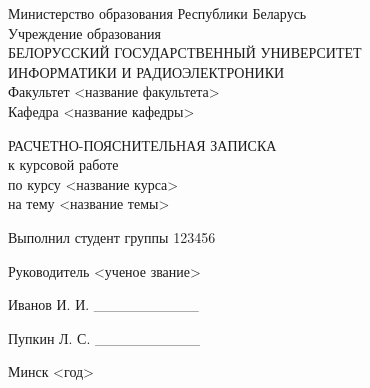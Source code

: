 \begin{titlepage}
\thispagestyle{empty}
\setlength{\parindent}{0ex} %

\begin{center}
  Министерство образования Республики Беларусь \\
  \smallskip
  Учреждение образования \\
  БЕЛОРУССКИЙ ГОСУДАРСТВЕННЫЙ УНИВЕРСИТЕТ \\
  ИНФОРМАТИКИ И РАДИОЭЛЕКТРОНИКИ \\
  \smallskip
  Факультет <название факультета> \\
  \smallskip
  Кафедра <название кафедры>
\end{center}

\vspace{60mm}

\begin{center}
  РАСЧЕТНО-ПОЯСНИТЕЛЬНАЯ ЗАПИСКА \\
  к курсовой работе \\
  по курсу <название курса> \\
  на тему <название темы> \\
\end{center}

\vspace{30mm}

\begin{minipage}{.55\linewidth}
    Выполнил студент группы 123456

    \smallskip

    Руководитель <ученое звание>
\end{minipage}
\hfill
\begin{minipage}{.4\linewidth}
  \begin{flushright}
    Иванов И. И. \_\_\_\_\_\_\_\_\_\_

    \smallskip

    Пупкин Л. С. \_\_\_\_\_\_\_\_\_\_
  \end{flushright}
\end{minipage}

\vfill
\begin{center}
  Минск <год>
\end{center}

\setlength{\parindent}{5ex} %
\end{titlepage}